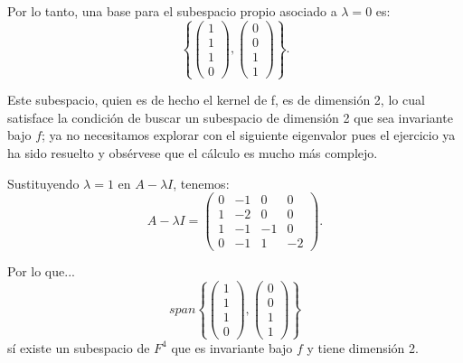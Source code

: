 \documentclass{article}
\begin{document}
Por lo tanto, una base para el subespacio propio asociado a \( \lambda = 0 \) es:
\[
\left\{ \begin{pmatrix} 1 \\ 1 \\ 1 \\ 0 \end{pmatrix}, \begin{pmatrix} 0 \\ 0 \\ 1 \\ 1 \end{pmatrix} \right\}.
\]

Este subespacio, quien es de hecho el kernel de f, es de dimensión 2, lo cual satisface la condición de buscar un subespacio de dimensión 2 que sea invariante bajo \( f \); ya no necesitamos explorar con el siguiente eigenvalor pues el ejercicio ya ha sido resuelto y obsérvese que el cálculo es mucho más complejo.

Sustituyendo \( \lambda = 1 \) en \( A - \lambda I \), tenemos:
\[
A - \lambda I = \begin{pmatrix} 0 & -1 & 0 & 0 \\ 1 & -2 & 0 & 0 \\ 1 & -1 & -1 & 0 \\ 0 & -1 & 1 & -2 \end{pmatrix}.
\]

Por lo que...
\[
span \left\{ \begin{pmatrix} 1 \\ 1 \\ 1 \\ 0 \end{pmatrix}, \begin{pmatrix} 0 \\ 0 \\ 1 \\ 1 \end{pmatrix} \right\}
\]
sí existe un subespacio de $F^4$ que es invariante bajo \( f \) y tiene dimensión 2. 
\end{document}
